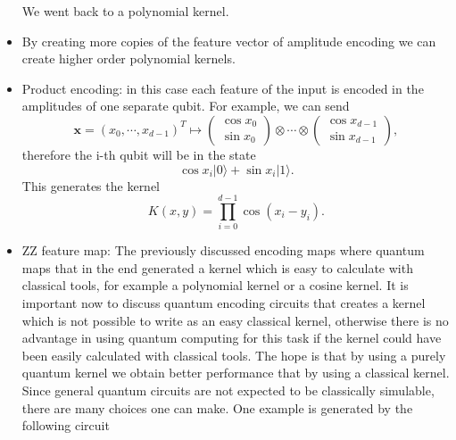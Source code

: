 \documentclass[a4paper]{article}
\begin{document}
\begin{itemize}
\begin{equation}
    \end{equation}
    We went back to a polynomial kernel. 
    \item By creating more copies of the feature vector of amplitude encoding we can create higher order polynomial kernels. 
    \item Product encoding: in this case each feature of the input is encoded in the amplitudes of one separate qubit. For example, we can send
    \begin{equation}
        \mathbf{x}=(x_0, \cdots, x_{d-1})^T \mapsto  \begin{pmatrix}
            \cos x_0\\\sin x_0
           \end{pmatrix} \otimes \cdots \otimes \begin{pmatrix}
            \cos x_{d-1}\\\sin x_{d-1}
           \end{pmatrix},
    \end{equation}
    therefore the i-th qubit will be in the state 
    \begin{equation}
        \cos x_i|0\rangle +\sin x_i |1\rangle. 
    \end{equation}
    This generates the kernel 
    \begin{equation}
        K(x,y)=\prod_{i=0}^{d-1}\cos(x_i-y_i).
    \end{equation}
    \item ZZ feature map: The previously discussed encoding maps where quantum maps that in the end generated a kernel which is easy to calculate with classical tools, for example a polynomial kernel or a cosine kernel. It is important now to discuss quantum encoding circuits that creates a kernel which is not possible to write as an easy classical kernel, otherwise there is no advantage in using quantum computing for this task if the kernel could have been easily calculated with classical tools. The hope is that by using a purely quantum kernel we obtain better performance that by using a classical kernel. Since general quantum circuits are not expected to be classically simulable, there are many choices one can make. One example is generated by the following circuit 


\end{itemize}
\end{document}
